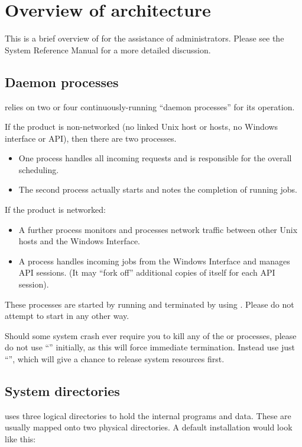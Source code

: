 \chapter{Overview of \manualProduct{} architecture}
\label{chp:overview-of-architecture}
This is a brief overview of \ProductName{} for the assistance of administrators. Please see the System Reference Manual for a more
detailed discussion.

\section{Daemon processes}
\ProductName{} relies on two or four continuously-running ``daemon processes'' for its operation.

If the product is non-networked (no linked Unix host or hosts, no Windows interface or API), then there are two
 processes.

\begin{itemize}
\item One  process handles all incoming requests and is responsible for the overall scheduling.
\item The second  process actually starts and notes the completion of running jobs.
\end{itemize}
If the product is networked:

\begin{itemize}
\item A further  process monitors and processes network traffic between other Unix hosts and the Windows
Interface.
\item A process  handles incoming jobs from the Windows Interface and manages API sessions. (It may
``fork off'' additional copies of itself for each API session).
\end{itemize}
These processes are started by running \PrBtstart{} and terminated by using \PrBtquit. Please do not
attempt to start \ProductName{} in any other way.

Should some system crash ever require you to kill any of the  or 
processes, please do not use ``'' initially, as this will force immediate termination.
Instead use just ``'', which will give  a chance to release system
resources first.

\section{System directories}
\ProductName{} uses three logical directories to hold the internal programs and data. These are usually mapped onto two physical directories. A default installation would look like this:

